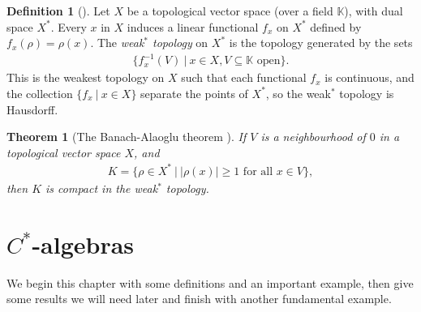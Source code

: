 \documentclass[12pt,a4paper]{report}
\theoremstyle{plain}
\newtheorem*{thm*}{Theorem}
\theoremstyle{definition}
\newtheorem*{defn*}{Definition}
\newcommand{\1}{\mathbbm{1}}
\begin{document}
\begin{defn*}[{\cite[3.14]{rudin91}}]
	Let $X$ be a topological vector space (over a field $\mathbb K$), with dual space $X^\ast$. Every 
	$x$ in $X$ induces a linear functional $f_x$ on $X^\ast$ defined by $f_x(\rho)=\rho(x)$. The 
	\emph{weak$^\ast$ topology} on $X^\ast$ is the topology generated by the sets 
	\begin{align*}
		\{f^{-1}_x(V) ~|~ x \in X, V\subseteq \mathbb K \mbox{ open}\}.
	\end{align*}
	This is the weakest topology on $X$ such that each functional $f_x$ is continuous, and the 
	collection $\{f_x ~|~ x\in X\}$ separate the points of $X^\ast$, so the weak$^\ast$ topology is 
	Hausdorff.
\end{defn*}
\begin{thm*}[{The Banach-Alaoglu theorem \cite{rudin91}}]
	If $V$ is a neighbourhood of $0$ in a topological vector space $X$, and
	\begin{align*}
		K=\{\rho\in X^\ast ~|~ |\rho(x)|\geq 1 \mbox{ for all } x \in V \},
	\end{align*}
	then $K$ is compact in the weak$^\ast$ topology.
\end{thm*}

\chapter{$C^\ast$-algebras}
We begin this chapter with some definitions and an important example, then give some results we 
will need later and finish with another fundamental example.
\end{document}

